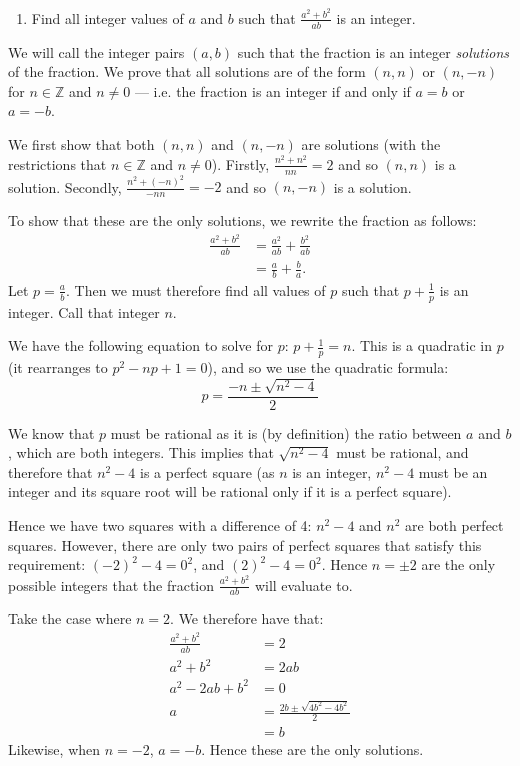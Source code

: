 \documentclass[a4paper,10pt]{article}
\newcommand{\answer}{\bfseries\color{Emerald}\refstepcounter{enumi}\item[\theenumi.]}
\begin{document}
\filbreak\begin{enumerate}[resume]
  \answer Find all integer values of $ a $ and $ b $ such that $ \frac{a^2+b^2}{ab} $ is an integer.
\end{enumerate}
We will call the integer pairs $ (a,b) $ such that the fraction is an integer \textit{solutions} of the fraction.
We prove that all solutions are of the form $ (n,n) $ or $ (n, -n) $ for $ n \in \mathbb{Z} $ and $ n \neq 0 $ --- i.e. the fraction
is an integer if and only if $ a = b $ or $ a = -b $.

We first show that both $ (n,n) $ and $ (n,-n) $ are solutions (with the restrictions that $ n \in \mathbb{Z} $ and $ n \neq 0 $).
Firstly, $ \frac{n^2 + n^2}{nn} = 2 $ and so $ (n,n) $ is a solution.
Secondly, $ \frac{n^2 + (-n)^2}{-nn} = -2 $ and so $ (n, -n) $ is a solution.

To show that these are the only solutions, we rewrite the fraction as follows:
\begin{align*}
  \frac{a^2 + b^2}{ab} &= \frac{a^2}{ab} + \frac{b^2}{ab}\\
                       &= \frac{a}{b} + \frac{b}{a}.
\end{align*}
Let $ p = \frac{a}{b} $. Then we must therefore find all values of $ p $ such that
$ p + \frac{1}{p} $ is an integer. Call that integer $ n $.

We have the following equation to solve for $ p $: $ p + \frac{1}{p} = n $. This is
a quadratic in $ p $ (it rearranges to $ p^2 - np + 1 = 0 $), and so we use the quadratic
formula:
\begin{displaymath}
  p = \frac{-n \pm \sqrt{n^2 - 4}}{2}
\end{displaymath}

We know that $ p $ must be rational as it is (by definition) the ratio between $ a $ and $ b $, which
are both integers. This implies that $ \sqrt{n^2 - 4} $ must be rational, and therefore that $ n^2 - 4 $ is
a perfect square (as $ n $ is an integer, $ n^2 - 4 $ must be an integer and its square
root will be rational only if it is a perfect square).

Hence we have two squares with a difference of 4: $ n^2 - 4 $ and $ n^2 $ are both perfect squares.
However, there are only two pairs of perfect squares that satisfy this requirement: $ (-2)^2 - 4 = 0^2 $,
and $ (2)^2 - 4 = 0^2 $. Hence $ n = \pm 2 $ are the only possible integers that the fraction $ \frac{a^2 + b^2}{ab} $ will
evaluate to.

Take the case where $ n = 2 $. We therefore have that:
\begin{align*}
  \frac{a^2 + b^2}{ab} &= 2\\
  a^2 + b^2 &= 2ab\\
  a^2 - 2ab + b^2 &= 0\\
  a &= \frac{2b \pm \sqrt{4b^2 - 4b^2}}{2}\\
    &= b
\end{align*}
Likewise, when $ n = -2 $, $ a = -b $. Hence these are the only solutions.
\end{document}
